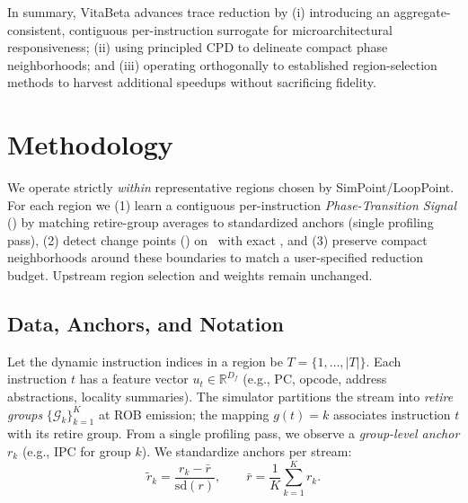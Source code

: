 
In summary, VitaBeta advances trace reduction by (i) introducing an aggregate-consistent, contiguous per-instruction surrogate for microarchitectural responsiveness; (ii) using principled CPD to delineate compact phase neighborhoods; and (iii) operating orthogonally to established region-selection methods to harvest additional speedups without sacrificing fidelity.

 




\section{Methodology}
\label{sec:methodology}

We operate strictly \emph{within} representative regions chosen by SimPoint/LoopPoint. For each region we (1) learn a contiguous per-instruction \emph{Phase-Transition Signal} (\pts) by matching retire-group averages to standardized anchors (single profiling pass), (2) detect change points (\cpd) on \pts\ with exact \pelt, and (3) preserve compact neighborhoods around these boundaries to match a user-specified reduction budget. Upstream region selection and weights remain unchanged.
\subsection{Data, Anchors, and Notation}
Let the dynamic instruction indices in a region be \(T=\{1,\ldots,|T|\}\). Each instruction \(t\) has a feature vector \(u_t\in\mathbb{R}^{D_f}\) (e.g., PC, opcode, address abstractions, locality summaries). The simulator partitions the stream into \emph{retire groups} \(\{\mathcal{G}_k\}_{k=1}^K\) at ROB emission; the mapping \(g(t)=k\) associates instruction \(t\) with its retire group. From a single profiling pass, we observe a \emph{group-level anchor} \(r_k\) (e.g., IPC for group \(k\)). We standardize anchors per stream:
\[
\tilde{r}_k=\frac{r_k-\bar{r}}{\mathrm{sd}(r)},\qquad \bar{r}=\frac{1}{K}\sum_{k=1}^{K}r_k.
\]

